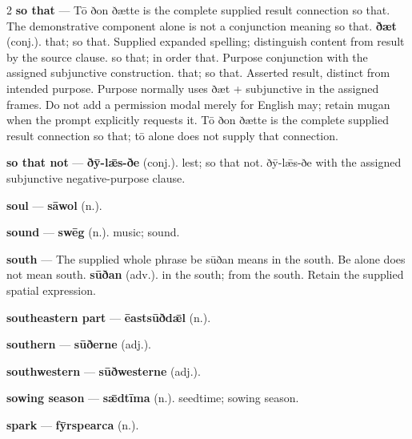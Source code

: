 \begin{multicols}{2}
\textbf{so that} — Tō ðon ðætte is the complete supplied result connection so that. The demonstrative component alone is not a conjunction meaning so that. \textbf{ðæt} (conj.). that; so that. Supplied expanded spelling; distinguish content from result by the source clause. so that; in order that. Purpose conjunction with the assigned subjunctive construction. that; so that. Asserted result, distinct from intended purpose. Purpose normally uses ðæt + subjunctive in the assigned frames. Do not add a permission modal merely for English may; retain mugan when the prompt explicitly requests it. Tō ðon ðætte is the complete supplied result connection so that; tō alone does not supply that connection.\par
\textbf{so that not} — \textbf{ðȳ-lǣs-ðe} (conj.). lest; so that not. ðȳ-lǣs-ðe with the assigned subjunctive negative-purpose clause.\par
\textbf{soul} — \textbf{sāwol} (n.).\par
\textbf{sound} — \textbf{swēg} (n.). music; sound.\par
\textbf{south} — The supplied whole phrase be sūðan means in the south. Be alone does not mean south. \textbf{sūðan} (adv.). in the south; from the south. Retain the supplied spatial expression.\par
\textbf{southeastern part} — \textbf{ēastsūðdǣl} (n.).\par
\textbf{southern} — \textbf{sūðerne} (adj.).\par
\textbf{southwestern} — \textbf{sūðwesterne} (adj.).\par
\textbf{sowing season} — \textbf{sǣdtīma} (n.). seedtime; sowing season.\par
\textbf{spark} — \textbf{fȳrspearca} (n.).\par

\end{multicols}

